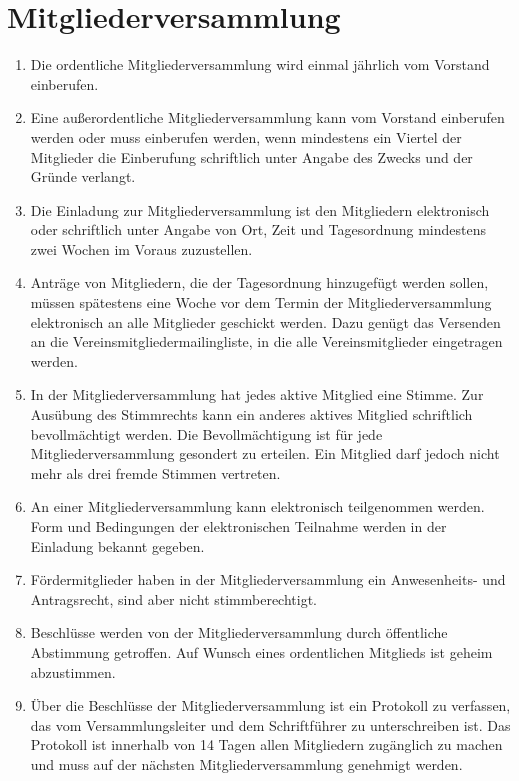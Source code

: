 \documentclass[ngerman]{article}
\begin{document}
\section{Mitgliederversammlung}
\begin{enumerate}
  \item Die ordentliche Mitgliederversammlung wird einmal jährlich vom Vorstand einberufen.
  \item Eine außerordentliche Mitgliederversammlung kann vom Vorstand einberufen werden oder muss einberufen werden, wenn mindestens ein Viertel der Mitglieder die Einberufung schriftlich unter Angabe des Zwecks und der Gründe verlangt.
  \item Die Einladung zur Mitgliederversammlung ist den Mitgliedern elektronisch oder schriftlich unter Angabe von Ort, Zeit und Tagesordnung mindestens zwei Wochen im Voraus zuzustellen.
  \item Anträge von Mitgliedern, die der Tagesordnung hinzugefügt werden sollen, müssen spätestens eine Woche vor dem Termin der Mitgliederversammlung elektronisch an alle Mitglieder geschickt werden. Dazu genügt das Versenden an die Vereinsmitgliedermailingliste, in die alle Vereinsmitglieder eingetragen werden.
  \item In der Mitgliederversammlung hat jedes aktive Mitglied eine Stimme. Zur Ausübung des Stimmrechts kann ein anderes aktives Mitglied schriftlich bevollmächtigt werden. Die Bevollmächtigung ist für jede Mitgliederversammlung gesondert zu erteilen. Ein Mitglied darf jedoch nicht mehr als drei fremde Stimmen vertreten.
  \item An einer Mitgliederversammlung kann elektronisch teilgenommen werden. Form und Bedingungen der elektronischen Teilnahme werden in der Einladung bekannt gegeben.
  \item Fördermitglieder haben in der Mitgliederversammlung ein Anwesenheits- und Antragsrecht, sind aber nicht stimmberechtigt.
  \item Beschlüsse werden von der Mitgliederversammlung durch öffentliche Abstimmung getroffen. Auf Wunsch eines ordentlichen Mitglieds ist geheim abzustimmen.
  \item Über die Beschlüsse der Mitgliederversammlung ist ein Protokoll zu verfassen, das vom Versammlungsleiter und dem Schriftführer zu unterschreiben ist. Das Protokoll ist innerhalb von 14 Tagen allen Mitgliedern zugänglich zu machen und muss auf der nächsten Mitgliederversammlung genehmigt werden.
\end{enumerate}
\end{document}
